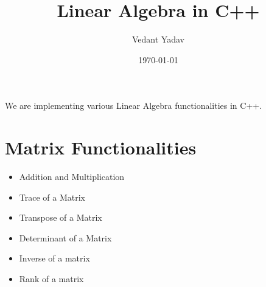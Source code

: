 \documentclass[12pt, letterpaper]{article}
\title{Linear Algebra in C++}
\author{Vedant Yadav}
\date{\today}
\begin{document}
\maketitle
We are implementing various Linear Algebra functionalities  in C++.
\section{Matrix Functionalities}
\begin{itemize}
	\item Addition and Multiplication
	\item Trace of a Matrix
	\item Transpose of a Matrix
	\item Determinant of a Matrix
	\item Inverse of a matrix
	\item Rank of a matrix
\end{itemize}
\end{document}
